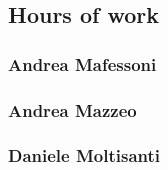\subsection{Hours of work}
\subsubsection{Andrea Mafessoni}

\subsubsection{Andrea Mazzeo}

\subsubsection{Daniele Moltisanti}